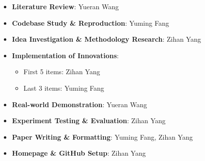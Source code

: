 \documentclass{article}
\begin{document}
\begin{itemize}
    \item \textbf{Literature Review}: Yueran Wang
    \item \textbf{Codebase Study \& Reproduction}: Yuming Fang
    \item \textbf{Idea Investigation \& Methodology Research}: Zihan Yang
    \item \textbf{Implementation of Innovations}: 
    \begin{itemize}
        \item First 5 items: Zihan Yang
        \item Last 3 items: Yuming Fang
    \end{itemize}
    \item \textbf{Real-world Demonstration}: Yueran Wang
    \item \textbf{Experiment Testing \& Evaluation}: Zihan Yang
    \item \textbf{Paper Writing \& Formatting}: Yuming Fang, Zihan Yang
    \item \textbf{Homepage \& GitHub Setup}: Zihan Yang
\end{itemize}
\end{document}
